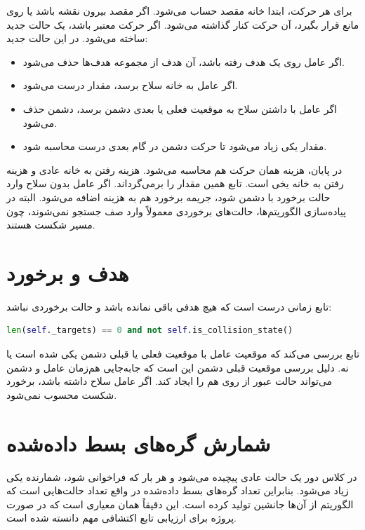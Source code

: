 \documentclass[10.5pt]{exam}
\begin{document}
برای هر حرکت، ابتدا خانه مقصد حساب می‌شود. اگر مقصد بیرون نقشه باشد یا روی مانع
قرار بگیرد، آن حرکت کنار گذاشته می‌شود. اگر حرکت معتبر باشد، یک حالت جدید ساخته می‌شود. در این حالت جدید:
\begin{itemize}
    \item اگر عامل روی یک هدف رفته باشد، آن هدف از مجموعه هدف‌ها حذف می‌شود.
    \item اگر عامل به خانه سلاح برسد، مقدار
    درست می‌شود.
    \item اگر عامل با داشتن سلاح به موقعیت فعلی یا بعدی دشمن برسد، دشمن حذف می‌شود.
    \item مقدار
    یکی زیاد می‌شود تا حرکت دشمن در گام بعدی درست محاسبه شود.
\end{itemize}

در پایان، هزینه همان حرکت هم محاسبه می‌شود. هزینه رفتن به خانه عادی
و هزینه رفتن به خانه یخی
است. تابع
همین مقدار را برمی‌گرداند. اگر عامل بدون سلاح وارد حالت برخورد با دشمن شود، جریمه برخورد هم به هزینه اضافه می‌شود. البته در پیاده‌سازی الگوریتم‌ها، حالت‌های برخوردی معمولاً وارد صف جستجو نمی‌شوند، چون مسیر شکست هستند.

\section{هدف و برخورد}
تابع
زمانی درست است که هیچ هدفی باقی نمانده باشد و حالت برخوردی نباشد:

\begin{latin}
\begin{lstlisting}[language=Python]
len(self._targets) == 0 and not self.is_collision_state()
\end{lstlisting}
\end{latin}

تابع
بررسی می‌کند که موقعیت عامل با موقعیت فعلی یا قبلی دشمن یکی شده است یا نه. دلیل بررسی موقعیت قبلی دشمن این است که جابه‌جایی هم‌زمان عامل و دشمن می‌تواند حالت عبور از روی هم را ایجاد کند. اگر عامل سلاح داشته باشد، برخورد شکست محسوب نمی‌شود.

\section{شمارش گره‌های بسط داده‌شده}
در
کلاس
دور یک حالت عادی پیچیده می‌شود و هر بار که
فراخوانی شود، شمارنده یکی زیاد می‌شود. بنابراین تعداد گره‌های بسط داده‌شده در واقع تعداد حالت‌هایی است که الگوریتم از آن‌ها جانشین تولید کرده است. این دقیقاً همان معیاری است که در صورت پروژه برای ارزیابی تابع اکتشافی مهم دانسته شده است.
\end{document}
